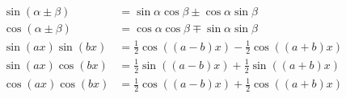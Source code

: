 \documentclass[11pt]{amsart}
\begin{document}
\begin{align*}
\sin(\alpha \pm \beta) &= \sin \alpha \cos \beta \pm \cos \alpha \sin \beta \\
\cos(\alpha \pm \beta) &= \cos \alpha \cos \beta \mp \sin \alpha \sin \beta \\
\sin(ax) \sin(bx) &= \frac{1}{2} \cos((a-b)x) - \frac{1}{2} \cos((a+b)x) \\
\sin(ax) \cos(bx) &= \frac{1}{2} \sin((a-b)x) + \frac{1}{2} \sin((a+b)x) \\
\cos(ax) \cos(bx) &= \frac{1}{2} \cos((a-b)x) + \frac{1}{2} \cos((a+b)x)
\end{align*}

\vspace{0.3in}

\end{document}
